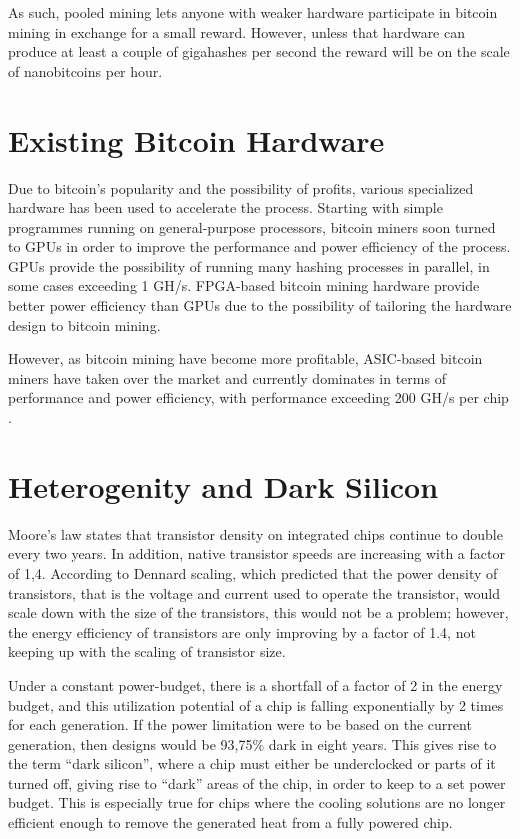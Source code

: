 As such, pooled mining lets anyone with weaker hardware participate in bitcoin mining in exchange for
a small reward. However, unless that hardware can produce at least a couple of gigahashes per second
the reward will be on the scale of nanobitcoins per hour.

\section{Existing Bitcoin Hardware}

Due to bitcoin's popularity and the possibility of profits, various specialized hardware has been used
to accelerate the process. Starting with simple programmes running on general-purpose processors,
bitcoin miners soon turned to GPUs in order to improve the performance and power efficiency of the
process. GPUs provide the possibility of running many hashing processes in parallel, in some cases
exceeding 1 GH/s\cite{bitcoin-hardware-cmp}. FPGA-based bitcoin mining hardware provide
better power efficiency than GPUs due to the possibility of tailoring the hardware design to
bitcoin mining.

However, as bitcoin mining have become more profitable, ASIC-based bitcoin miners have taken over
the market and currently dominates in terms of performance and power efficiency, with performance
exceeding 200 GH/s 
per chip \cite{bespoke-silicon}.

\section{Heterogenity and Dark Silicon}
\label{sec:dark-silicon}

Moore's law states that transistor density on integrated chips continue to double every
two years. In addition, native transistor speeds are increasing with a factor of 1,4.
According to Dennard scaling, which predicted that the power density of transistors, that
is the voltage and current used to operate the transistor, would scale down with the
size of the transistors, this would not be a problem; however, the energy efficiency
of transistors are only improving by a factor of 1.4, not keeping up with the scaling
of transistor size.

Under a constant power-budget, there is a shortfall of a factor of 2 in the energy budget,
and this utilization potential of a chip is falling exponentially by 2 times for each generation.
If the power limitation were to be based on the current generation, then designs would be 93,75\% dark in eight years.
This gives rise to the term ``dark silicon'', where a chip must either be underclocked or parts of
it turned off, giving rise to ``dark'' areas of the chip, in order to keep to a set power budget.
This is especially true for chips where the cooling solutions are no longer efficient enough to remove
the generated heat from a fully powered chip.

